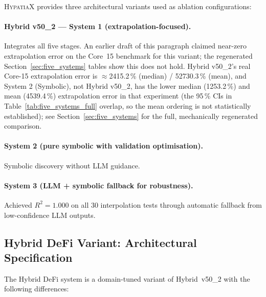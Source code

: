 \documentclass[twoside,11pt]{article}
\begin{document}
\textsc{HypatiaX} provides three architectural variants used as ablation
configurations:

\paragraph{Hybrid v50\_2 --- System 1 (extrapolation-focused).}
Integrates all five stages. An earlier draft of this paragraph claimed
near-zero extrapolation error on the Core~15 benchmark for this variant;
the regenerated Section~\ref{sec:five_systems} tables show this does not
hold. Hybrid v50\_2's real Core-15 extrapolation error is $\approx$2415.2\,\%
(median) / 52730.3\,\% (mean), and System 2 (Symbolic), not Hybrid v50\_2,
has the lower median (1253.2\,\%) and mean (4539.4\,\%) extrapolation error in that
experiment (the 95\,\% CIs in
Table~\ref{tab:five_systems_full} overlap, so the mean ordering is not
statistically established); see
Section~\ref{sec:five_systems} for the full, mechanically regenerated
comparison.

\paragraph{System 2 (pure symbolic with validation optimisation).}
Symbolic discovery without LLM guidance.

\paragraph{System 3 (LLM + symbolic fallback for robustness).}
Achieved $R^2 = 1.000$ on all 30 interpolation tests through automatic
fallback from low-confidence LLM outputs.

\subsection{Hybrid DeFi Variant: Architectural Specification}\label{subsec:hybrid-defi-variant-architectural-specif}
\label{sec:hybrid_defi_spec}

The Hybrid DeFi system is a domain-tuned variant of Hybrid~v50\_2 with the
following differences:
\end{document}
